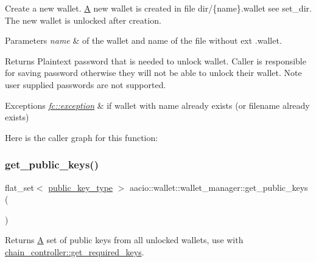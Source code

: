 Create a new wallet. \mbox{\hyperlink{struct_a}{A}} new wallet is created in file dir/\{name\}.wallet see set\+\_\+dir. The new wallet is unlocked after creation. 
\begin{DoxyParams}{Parameters}
{\em name} & of the wallet and name of the file without ext .wallet. \\
\hline
\end{DoxyParams}
\begin{DoxyReturn}{Returns}
Plaintext password that is needed to unlock wallet. Caller is responsible for saving password otherwise they will not be able to unlock their wallet. Note user supplied passwords are not supported. 
\end{DoxyReturn}

\begin{DoxyExceptions}{Exceptions}
{\em \mbox{\hyperlink{classfc_1_1exception}{fc\+::exception}}} & if wallet with name already exists (or filename already exists) \\
\hline
\end{DoxyExceptions}
Here is the caller graph for this function\+:
\mbox{\label{classaacio_1_1wallet_1_1wallet__manager_aeb2f671ec95e19c2da2170774c0db627}} 
\subsubsection{\texorpdfstring{get\+\_\+public\+\_\+keys()}{get\_public\_keys()}}
{\footnotesize\ttfamily flat\+\_\+set$<$ \mbox{\hyperlink{classfc_1_1crypto_1_1public__key}{public\+\_\+key\+\_\+type}} $>$ aacio\+::wallet\+::wallet\+\_\+manager\+::get\+\_\+public\+\_\+keys (\begin{DoxyParamCaption}{ }\end{DoxyParamCaption})}

\begin{DoxyReturn}{Returns}
\mbox{\hyperlink{struct_a}{A}} set of public keys from all unlocked wallets, use with \mbox{\hyperlink{classaacio_1_1chain_1_1chain__controller_af2f9f9c166af2e8d8dc8811d242e872a}{chain\+\_\+controller\+::get\+\_\+required\+\_\+keys}}. 
\end{DoxyReturn}
\mbox{\label{classaacio_1_1wallet_1_1wallet__manager_abd33e1ad084b2ba18398848f99ab62fe}} 
